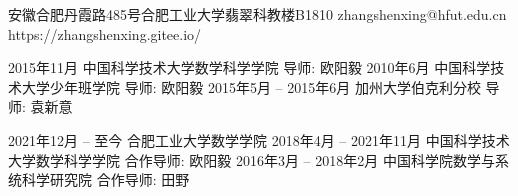 \documentclass[11pt]{article}
\begin{document}
	{安徽合肥丹霞路485号合肥工业大学翡翠科教楼B1810}
	{zhangshenxing@hfut.edu.cn}
	{https://zhangshenxing.gitee.io/}


\begin{cvstage}
		{2015年11月}
		{中国科学技术大学数学科学学院}
		{导师: 欧阳毅}
		{2010年6月}
		{中国科学技术大学少年班学院}
		{导师: 欧阳毅}
		{2015年5月 -- 2015年6月}
		{加州大学伯克利分校}
		{导师: 袁新意}
\end{cvstage}


\begin{cvstage}
		{2021年12月 -- 至今}
		{合肥工业大学数学学院}
		{}
		{2018年4月 -- 2021年11月}
		{中国科学技术大学数学科学学院}
		{合作导师: 欧阳毅}
		{2016年3月 -- 2018年2月}
		{中国科学院数学与系统科学研究院}
		{合作导师: 田野}
\end{cvstage}
\end{document}
